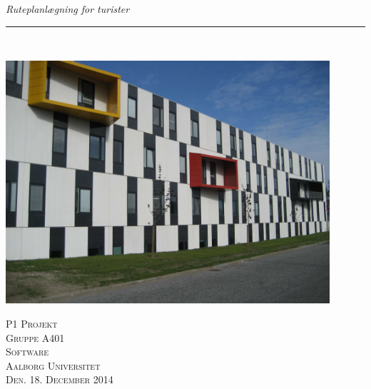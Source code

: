 \thispagestyle{empty}
\begin{flushright}
\vspace{3cm}

\phantom{hul}

\phantom{hul}

\phantom{hul}

\textsl{\Huge Ruteplanlægning for turister} \\ \vspace{1cm}

\rule{13cm}{3mm} \\ \vspace{1.5cm}
\vspace{1cm}

\includegraphics[width=0.9\textwidth]{billeder/forside.jpg}

\vspace{2cm} 
\textsc{\Large P1 Projekt \\
Gruppe A401 \\
Software\\
Aalborg Universitet\\
Den. 18. December 2014\\}
\end{flushright}
